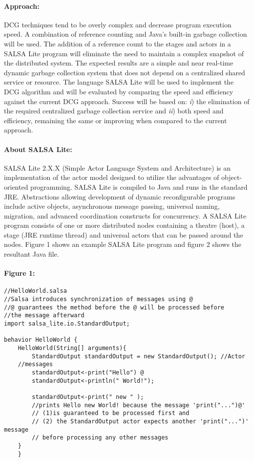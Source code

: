 \documentclass[12pt]{article}
\begin{document}
\paragraph{Approach:} \hspace{-5mm} DCG techniques tend to be overly complex and decrease program execution speed. A combination of reference counting and Java's built-in garbage collection will be used. The addition of a reference count to the stages and actors in a SALSA Lite program will eliminate the need to maintain a complex snapshot of the distributed system.  The expected results are a simple and near real-time dynamic garbage collection system that does not depend on a centralized shared service or resource. The language SALSA Lite will be used to implement the DCG algorithm and will be evaluated  by comparing the speed and efficiency against the current DCG approach. Success will be based on: {\it i}) the elimination of the required centralized garbage collection service and {\it ii}) both speed and efficiency, remaining the same or improving when compared to the current approach.   

 \paragraph{About SALSA Lite:}\hspace{-5mm} SALSA Lite 2.X.X (Simple Actor Language System and Architecture) is an implementation of the actor model designed to utilize the advantages of object-oriented programming. SALSA Lite is compiled to Java and runs in the standard JRE. Abstractions allowing development of dynamic reconfigurable programs include active objects, asynchronous message passing, universal naming, migration, and advanced coordination constructs for concurrency. A SALSA Lite program consists of one or more distributed nodes containing a theatre (host), a stage (JRE runtime thread) and universal actors that can be passed around the nodes. Figure 1 shows an example SALSA Lite program and figure 2 shows the resultant Java file.
\newpage
\paragraph{Figure 1:\hfill} 
\noindent
\begin{lstlisting} 
//HelloWorld.salsa     
//Salsa introduces synchronization of messages using @
//@ guarantees the method before the @ will be processed before
//the message afterward
import salsa_lite.io.StandardOutput;

behavior HelloWorld {
    HelloWorld(String[] arguments){
        StandardOutput standardOutput = new StandardOutput(); //Actor
	//messages
        standardOutput<-print("Hello") @
        standardOutput<-println(" World!");

        standardOutput<-print(" new " );
        //prints Hello new World! because the message 'print("...")@'
        // (1)is guaranteed to be processed first and  
        // (2) the StandardOutput actor expects another 'print("...")' message  
        // before processing any other messages 
    }
    }\end{lstlisting} 
\newpage
\end{document}
